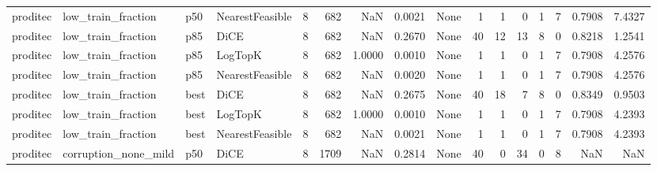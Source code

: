 \begin{tabular}{llllrrrrlrrrrrrr}
proditec &   low\_train\_fraction &    p50 & NearestFeasible &            8 &                  682 &                      NaN &      0.0021 &                                               None &      1 &            1 &        0 &              1 &          7 &             0.7908 &         7.4327 \\
proditec &   low\_train\_fraction &    p85 &            DiCE &            8 &                  682 &                      NaN &      0.2670 &                                               None &     40 &           12 &       13 &              8 &          0 &             0.8218 &         1.2541 \\
proditec &   low\_train\_fraction &    p85 &         LogTopK &            8 &                  682 &                   1.0000 &      0.0010 &                                               None &      1 &            1 &        0 &              1 &          7 &             0.7908 &         4.2576 \\
proditec &   low\_train\_fraction &    p85 & NearestFeasible &            8 &                  682 &                      NaN &      0.0020 &                                               None &      1 &            1 &        0 &              1 &          7 &             0.7908 &         4.2576 \\
proditec &   low\_train\_fraction &   best &            DiCE &            8 &                  682 &                      NaN &      0.2675 &                                               None &     40 &           18 &        7 &              8 &          0 &             0.8349 &         0.9503 \\
proditec &   low\_train\_fraction &   best &         LogTopK &            8 &                  682 &                   1.0000 &      0.0010 &                                               None &      1 &            1 &        0 &              1 &          7 &             0.7908 &         4.2393 \\
proditec &   low\_train\_fraction &   best & NearestFeasible &            8 &                  682 &                      NaN &      0.0021 &                                               None &      1 &            1 &        0 &              1 &          7 &             0.7908 &         4.2393 \\
proditec & corruption\_none\_mild &    p50 &            DiCE &            8 &                 1709 &                      NaN &      0.2814 &                                               None &     40 &            0 &       34 &              0 &          8 &                NaN &            NaN \\

\end{tabular}
